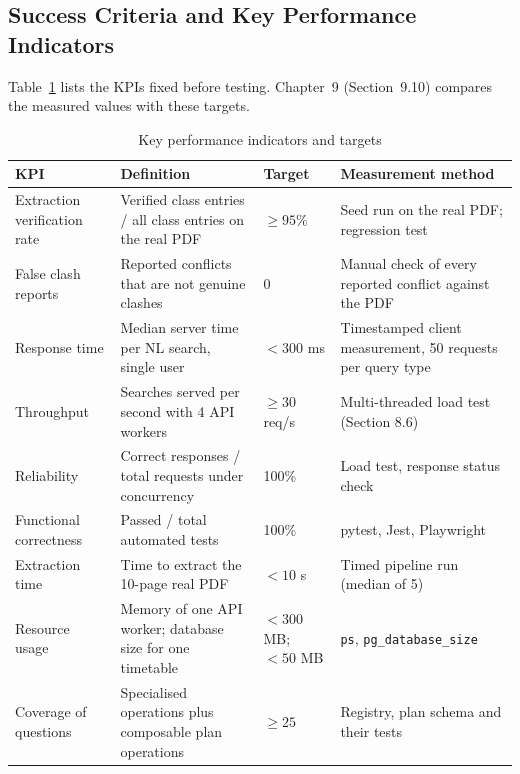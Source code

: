 \subsection{Success Criteria and Key Performance Indicators}
Table~\ref{tab:kpi} lists the KPIs fixed before testing. Chapter~9 (Section~9.10) compares the measured values with
these targets.

\begin{table}[H]
\centering
\caption{Key performance indicators and targets}
\label{tab:kpi}
\small
\begin{tabularx}{\textwidth}{@{}p{2.8cm}X p{3.0cm}X@{}}
\toprule
\textbf{KPI} & \textbf{Definition} & \textbf{Target} & \textbf{Measurement method}\\
\midrule
Extraction verification rate & Verified class entries / all class entries on the real PDF & $\geq 95\%$ & Seed run on the real PDF; regression test\\
False clash reports & Reported conflicts that are not genuine clashes & 0 & Manual check of every reported conflict against the PDF\\
Response time & Median server time per NL search, single user & $< 300$ ms & Timestamped client measurement, 50 requests per query type\\
Throughput & Searches served per second with 4 API workers & $\geq 30$ req/s & Multi-threaded load test (Section 8.6)\\
Reliability & Correct responses / total requests under concurrency & 100\% & Load test, response status check\\
Functional correctness & Passed / total automated tests & 100\% & pytest, Jest, Playwright\\
Extraction time & Time to extract the 10-page real PDF & $< 10$ s & Timed pipeline run (median of 5)\\
Resource usage & Memory of one API worker; database size for one timetable & $< 300$ MB; $< 50$ MB & \texttt{ps}, \texttt{pg\_database\_size}\\
Coverage of questions & Specialised operations plus composable plan operations & $\geq 25$ & Registry, plan schema and their tests\\
\bottomrule
\end{tabularx}
\end{table}

\newpage
